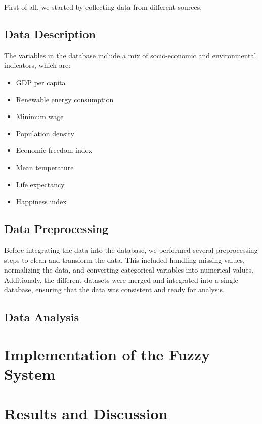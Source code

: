 \documentclass[fleqn,11pt]{article}
\begin{document}
First of all, we started by collecting data from different sources. 

\subsection{Data Description}
The variables in the database include a mix of socio-economic and environmental indicators, which are:
\begin{itemize}  %
	\item GDP per capita
	\item Renewable energy consumption
	\item Minimum wage
	\item Population density
	\item Economic freedom index
	\item Mean temperature
	\item Life expectancy
	\item Happiness index
\end{itemize}

\subsection{Data Preprocessing}
Before integrating the data into the database, we performed several preprocessing steps to clean and transform the data.
This included handling missing values, normalizing the data, and converting categorical variables into numerical values.
Additionaly, the different datasets were merged and integrated into a single database, ensuring that the data was consistent and ready for analysis.

\subsection{Data Analysis}


\section{Implementation of the Fuzzy System}


\section{Results and Discussion}
\end{document}
